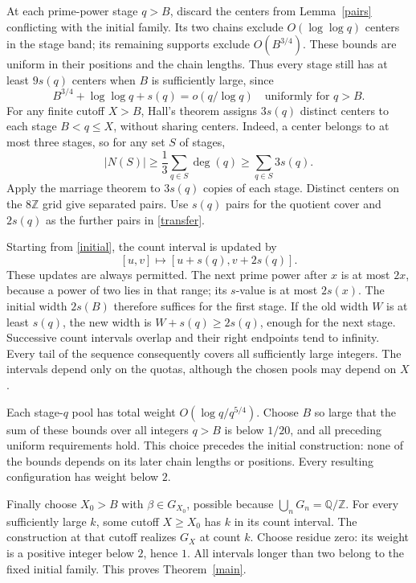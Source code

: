 \documentclass[11pt]{article}
\newcommand{\Z}{\mathbb Z}
\newcommand{\Q}{\mathbb Q}
\begin{document}
At each prime-power stage \(q>B\), discard the centers from
Lemma~\ref{pairs} conflicting with the initial family.
Its two chains exclude \(O(\log\log q)\) centers in the stage
band; its remaining supports exclude \(O(B^{3/4})\).
These bounds are uniform in their positions and the chain lengths.
Thus every stage still has at least \(9s(q)\) centers when
\(B\) is sufficiently large, since
\[
             B^{3/4}+\log\log q+s(q)=o(q/\log q)
                 \quad\text{uniformly for }q>B.
\]
For any finite cutoff \(X>B\), Hall's theorem assigns \(3s(q)\)
distinct centers to each stage \(B<q\le X\), without sharing centers.
Indeed, a center belongs to at most three stages, so for any
set \(S\) of stages,
\[
             |N(S)|\ge\frac13\sum_{q\in S}\deg(q)
                       \ge\sum_{q\in S}3s(q).
\]
Apply the marriage theorem to \(3s(q)\) copies of each stage.
Distinct centers on the \(8\Z\) grid give separated pairs.
Use \(s(q)\) pairs for the quotient cover and \(2s(q)\) as
the further pairs in \eqref{transfer}.

Starting from \eqref{initial}, the count interval is updated by
\[
                   [u,v]\longmapsto[u+s(q),v+2s(q)].
\]
These updates are always permitted. The next prime power after
\(x\) is at most \(2x\), because a power of two lies in that range;
its \(s\)-value is at most \(2s(x)\).
The initial width \(2s(B)\) therefore suffices for the first stage.
If the old width \(W\) is at least \(s(q)\), the new width is
\(W+s(q)\ge2s(q)\), enough for the next stage.
Successive count intervals overlap and their right endpoints
tend to infinity. Every tail of the sequence consequently covers
all sufficiently large integers. The intervals depend only on
the quotas, although the chosen pools may depend on \(X\).

Each stage-\(q\) pool has total weight \(O(\log q/q^{5/4})\).
Choose \(B\) so large that the sum of these bounds over all
integers \(q>B\) is below \(1/20\), and all preceding uniform
requirements hold. This choice precedes the initial construction:
none of the bounds depends on its later chain lengths or positions.
Every resulting configuration has weight below \(2\).

Finally choose \(X_0>B\) with \(\beta\in G_{X_0}\), possible
because \(\bigcup_nG_n=\Q/\Z\).
For every sufficiently large \(k\), some cutoff \(X\ge X_0\)
has \(k\) in its count interval. The construction at that cutoff
realizes \(G_X\) at count \(k\).
Choose residue zero: its weight is a positive integer below \(2\),
hence \(1\). All intervals longer than two belong to the fixed initial family.
This proves Theorem~\ref{main}.
\end{document}
